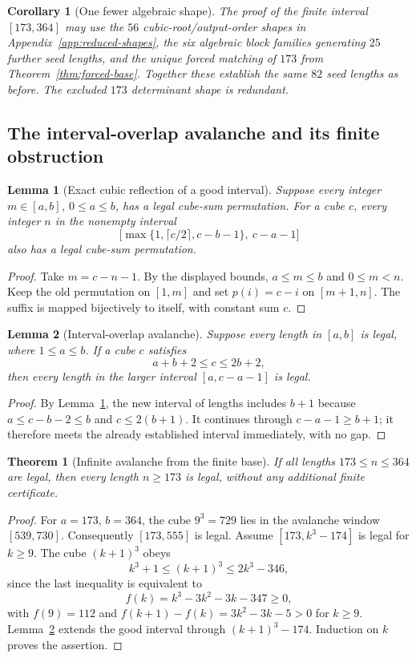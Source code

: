 \documentclass[10pt]{article}
\newtheorem{theorem}{Theorem}
\newtheorem{lemma}{Lemma}
\newtheorem{corollary}{Corollary}
\begin{document}
\begin{corollary}[One fewer algebraic shape]
\label{cor:56-plus-forcing}
The proof of the finite interval $[173,364]$
may use the $56$ cubic-root/output-order
shapes in Appendix~\ref{app:reduced-shapes},
the six algebraic block families generating
$25$ further seed lengths, and the unique
forced matching of $173$ from
Theorem~\ref{thm:forced-base}.
Together these establish the same $82$
seed lengths as before. The excluded
$173$ determinant shape is redundant.
\end{corollary}

\subsection{The interval-overlap avalanche and its finite obstruction}
\label{subsec:interval-overlap-avalanche}

\begin{lemma}[Exact cubic reflection of a good interval]
\label{lem:reflection-overlap}
Suppose every integer $m\in[a,b]$, $0\le a\le b$,
has a legal cube-sum permutation. For a cube $c$,
every integer $n$ in the nonempty interval
\[
\bigl[
\max\{1,\lceil c/2\rceil,c-b-1\},\
c-a-1
\bigr]
\]
also has a legal cube-sum permutation.
\end{lemma}
\begin{proof}
Take $m=c-n-1$. By the displayed bounds,
$a\le m\le b$ and $0\le m<n$.
Keep the old permutation on $[1,m]$ and set
$p(i)=c-i$ on $[m+1,n]$. The suffix is mapped
bijectively to itself, with constant sum $c$.
\end{proof}

\begin{lemma}[Interval-overlap avalanche]
\label{lem:interval-avalanche}
Suppose every length in $[a,b]$ is legal,
where $1\le a\le b$. If a cube $c$ satisfies
\[
\boxed{a+b+2\le c\le2b+2},
\]
then every length in the larger interval
$[a,c-a-1]$ is legal.
\end{lemma}
\begin{proof}
By Lemma~\ref{lem:reflection-overlap},
the new interval of lengths includes $b+1$
because $a\le c-b-2\le b$ and
$c\le2(b+1)$. It continues through
$c-a-1\ge b+1$; it therefore meets the
already established interval immediately,
with no gap.
\end{proof}

\begin{theorem}[Infinite avalanche from the finite base]
\label{thm:interval-avalanche-tail}
If all lengths $173\le n\le364$ are legal,
then every length $n\ge173$ is legal,
without any additional finite certificate.
\end{theorem}
\begin{proof}
For $a=173$, $b=364$, the cube $9^3=729$
lies in the avalanche window $[539,730]$.
Consequently $[173,555]$ is legal.
Assume $[173,k^3-174]$ is legal for $k\ge9$.
The cube $(k+1)^3$ obeys
\[
k^3+1\le(k+1)^3\le2k^3-346,
\]
since the last inequality is equivalent to
\[
f(k)=k^3-3k^2-3k-347\ge0,
\]
with $f(9)=112$ and
$f(k+1)-f(k)=3k^2-3k-5>0$ for $k\ge9$.
Lemma~\ref{lem:interval-avalanche}
extends the good interval through
$(k+1)^3-174$. Induction on $k$ proves
the assertion.
\end{proof}
\end{document}
